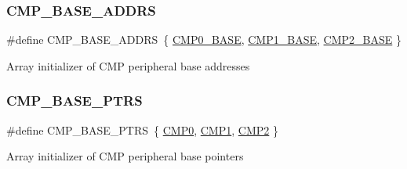 \subsubsection{\texorpdfstring{C\+M\+P\+\_\+\+B\+A\+S\+E\+\_\+\+A\+D\+D\+RS}{CMP\_BASE\_ADDRS}}
{\footnotesize\ttfamily \#define C\+M\+P\+\_\+\+B\+A\+S\+E\+\_\+\+A\+D\+D\+RS~\{ \mbox{\hyperlink{group___c_m_p___register___masks_gaa174cde56b35e3d6a74b2a752296c268}{C\+M\+P0\+\_\+\+B\+A\+SE}}, \mbox{\hyperlink{group___c_m_p___register___masks_ga890dc341ab8c2c9f71f9840cda07b9cb}{C\+M\+P1\+\_\+\+B\+A\+SE}}, \mbox{\hyperlink{group___c_m_p___register___masks_ga7e986bf6335f75207120a0ee5b84d1c6}{C\+M\+P2\+\_\+\+B\+A\+SE}} \}}

Array initializer of C\+MP peripheral base addresses \mbox{\label{group___c_m_p___register___masks_gacc69654296499d45b2060956a3c8e97f}} 
\subsubsection{\texorpdfstring{C\+M\+P\+\_\+\+B\+A\+S\+E\+\_\+\+P\+T\+RS}{CMP\_BASE\_PTRS}}
{\footnotesize\ttfamily \#define C\+M\+P\+\_\+\+B\+A\+S\+E\+\_\+\+P\+T\+RS~\{ \mbox{\hyperlink{group___c_m_p___register___masks_ga2cf98276319113bb5d9ece4d7d7ed09d}{C\+M\+P0}}, \mbox{\hyperlink{group___c_m_p___register___masks_ga4feda05828d32e7b657d871ccf105538}{C\+M\+P1}}, \mbox{\hyperlink{group___c_m_p___register___masks_ga023ff9e161b651f7f47e0457fe0c1fcb}{C\+M\+P2}} \}}

Array initializer of C\+MP peripheral base pointers \mbox{\label{group___c_m_p___register___masks_ga1f6d81f303672acd661263de6da7ea13}} 

